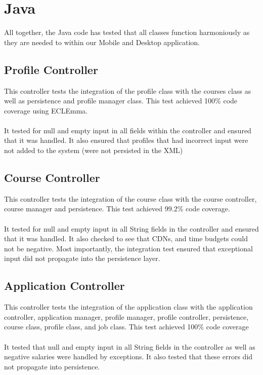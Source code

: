 \documentclass[12pt]{report}
\begin{document}
\section{Java}
All together, the Java code has tested that all classes function harmoniously as they are needed to within our Mobile and Desktop application.

\subsection{Profile Controller}
This controller tests the integration of the profile class with the courses class as well as persistence and profile manager class. This test achieved 100\% code coverage using ECLEmma. \\\\
It tested for null and empty input in all fields within the controller and ensured that it was handled. It also ensured that profiles that had incorrect input were not added to the system (were not persisted in the XML)

\subsection{Course Controller}
This controller tests the integration of the course class with the course controller, course manager and persistence. This test achieved 99.2\% code coverage. \\\\
It tested for null and empty input in all String fields in the controller and ensured that it was handled. It also checked to see that CDNs, and time budgets could not be negative. Most importantly, the integration test ensured that exceptional input did not propagate into the persistence layer.

\subsection{Application Controller}
This controller tests the integration of the application class with the application controller, application manager, profile manager, profile controller, persistence, course class, profile class, and job class. This test achieved 100\% code coverage \\\\
It tested that null and empty input in all String fields in the controller as well as negative salaries were handled by exceptions. It also tested that these errors did not propagate into persistence. 
\end{document}
